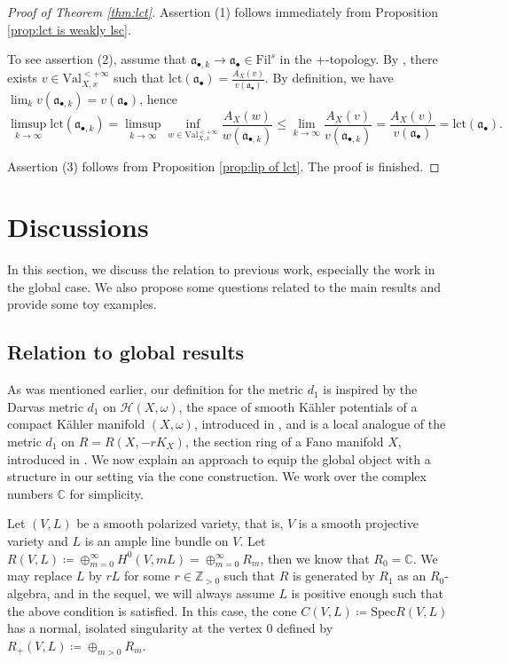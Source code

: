 \documentclass[11pt, leqno]{amsart}%
\theoremstyle{plain}
\theoremstyle{definition}
\theoremstyle{remark}
\newcommand{\cH}{\mathcal{H}}
\newcommand{\bC}{\mathbb{C}}
\newcommand{\bZ}{\mathbb{Z}}
\newcommand{\fa}{\mathfrak{a}}
\newcommand{\lct}{\mathrm{lct}}
\newcommand{\Val}{\mathrm{Val}}
\newcommand{\Spec}{\mathrm{Spec}}
\newcommand{\Fil}{\mathrm{Fil}}
\numberwithin{equation}{section}
\begin{document}
\begin{proof}[Proof of Theorem \ref{thm:lct}]
    Assertion (1) follows immediately from Proposition \ref{prop:lct is weakly lsc}. 
	
    To see assertion (2), assume that $\fa_{\bullet,k}\to\fa_\bullet\in\Fil^s$ in the $+$-topology. By \cite[Theorem B.1]{Blu18}, there exists $v\in\Val^{<+\infty}_{X,x}$ such that $\lct(\fa_\bullet)=\frac{A_X(v)}{v(\fa_\bullet)}$. By definition, we have $\lim_k v(\fa_{\bullet,k})=v(\fa_\bullet)$, hence
    \[
        \limsup_{k\to\infty} \lct(\fa_{\bullet,k})= \limsup_{k\to\infty} \inf_{w\in\Val^{<+\infty}_{X,x}}\frac{A_X(w)}{w(\fa_{\bullet,k})} \le \lim_{k\to\infty} \frac{A_X(v)}{v(\fa_{\bullet,k})}=\frac{A_X(v)}{v(\fa_\bullet)}=\lct(\fa_\bullet).
    \]
	
    Assertion (3) follows from Proposition \ref{prop:lip of lct}. The proof is finished.
\end{proof}





\section{Discussions}\label{sec:discussion}

In this section, we discuss the relation to previous work, especially the work in the global case. We also propose some questions related to the main results and provide some toy examples.



\subsection{Relation to global results}
As was mentioned earlier, our definition for the metric $d_1$ is inspired by the Darvas metric $d_1$ on $\cH(X,\omega)$, the space of smooth K\"ahler potentials of a compact K\"ahler manifold $(X,\omega)$, introduced in \cite{Dar15}, and is a local analogue of the metric $d_1$ on $R=R(X, -rK_X)$, the section ring of a Fano manifold $X$, introduced in \cite{BJ21}. We now explain an approach to equip the global object with a structure in our setting via the cone construction. We work over the complex numbers $\bC$ for simplicity.


Let $(V,L)$ be a smooth polarized variety, that is, $V$ is a smooth projective variety and $L$ is an ample line bundle on $V$. Let $R(V,L)\coloneqq\oplus_{m=0}^\infty H^0(V,mL)=\oplus_{m=0}^\infty R_m$, then we know that $R_0=\bC$. We may replace $L$ by $rL$ for some $r\in\bZ_{>0}$ such that $R$ is generated by $R_1$ as an $R_0$-algebra, and in the sequel, we will always assume $L$ is positive enough such that the above condition is satisfied. In this case, the cone $C(V,L)\coloneqq\Spec R(V,L)$ has a normal, isolated singularity at the vertex $0$ defined by $R_+(V,L)\coloneqq\oplus_{m>0} R_m$. 
\end{document}
